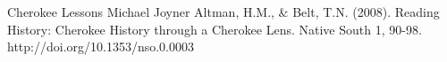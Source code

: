 

\begin{thebibliography}{99}
 Cherokee Lessons Michael Joyner
 Altman, H.M., \& Belt, T.N. (2008). Reading History: Cherokee History through a Cherokee Lens. Native South 1, 90-98. http://doi.org/10.1353/nso.0.0003
\end{thebibliography}
